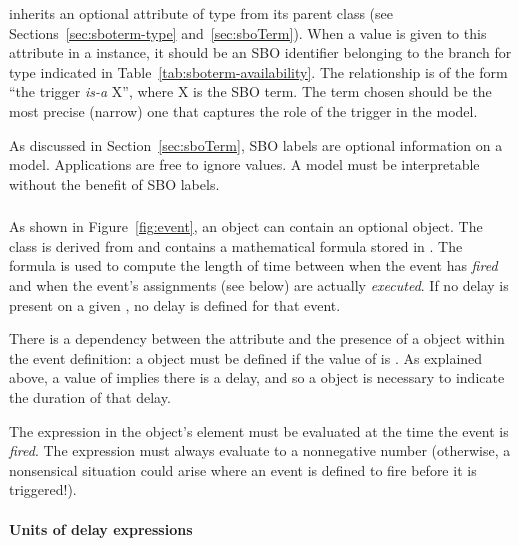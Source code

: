 \Trigger inherits an optional  attribute of type
 from its parent class \SBase (see
Sections~\ref{sec:sboterm-type} and~\ref{sec:sboTerm}).  When a
value is given to this attribute in a \Trigger instance, it should
be an SBO identifier belonging to the branch for type \Trigger
indicated in Table~\ref{tab:sboterm-availability}.  The
relationship is of the form ``the trigger \emph{is-a} X'', where X
is the SBO term.  The term chosen should be the most precise
(narrow) one that captures the role of the trigger in the model.

As discussed in Section~\ref{sec:sboTerm}, SBO labels are optional
information on a model.  Applications are free to ignore
 values.  A model must be interpretable without the
benefit of SBO labels.


\subsubsection{}
\label{sec:event-delay}

As shown in Figure~\ref{fig:event}, an \Event object can contain
an optional \Delay object.  The \Delay class is derived from
\SBase and contains a mathematical formula stored in .
The formula is used to compute the length of time between when the
event has \emph{fired} and when the event's assignments (see
below) are actually \emph{executed}.  If no delay is present on a
given \Event, no delay is defined for that event.

There is a dependency between the \Event attribute
 and the presence of a \Delay
object within the event definition: a \Delay object must be
defined if the value of  is
.  As explained above, a value of  implies
there is a delay, and so a \Delay object is necessary to indicate
the duration of that delay.

The expression in the \Delay object's  element must be
evaluated at the time the event is \emph{fired}.  The expression
must always evaluate to a nonnegative number (otherwise, a
nonsensical situation could arise where an event is defined to
fire before it is triggered!).


\paragraph{Units of delay expressions}

